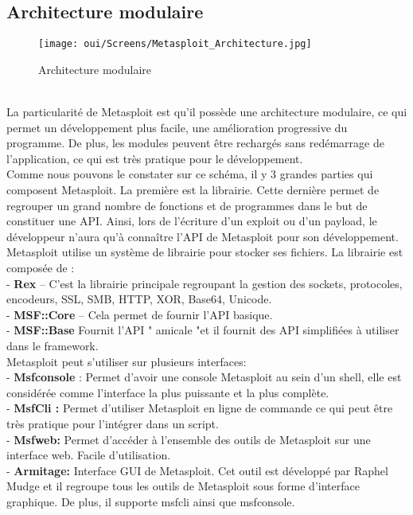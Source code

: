 \subsection{Architecture modulaire}
\begin{figure}[htp!]
  \centering
  \setlength\figureheight{7cm}
  \setlength\figurewidth{9cm}
  \texttt{[image: oui/Screens/Metasploit\_Architecture.jpg]}
  \caption{Architecture modulaire}
  \label{fig:courbe-tikz}
\end{figure}\\
La particularité de Metasploit est qu’il possède une architecture modulaire, ce qui permet un développement plus facile, une amélioration progressive du programme. De plus, les modules peuvent être rechargés sans redémarrage de l’application, ce qui est très pratique pour le développement.\\
Comme nous pouvons le constater sur ce schéma, il y 3 grandes parties qui composent Metasploit. La première est la librairie. Cette dernière permet de regrouper un grand nombre de fonctions et de programmes dans le but de constituer une API. Ainsi, lors de l’écriture d’un exploit ou d’un payload, le développeur n’aura qu'à connaître l’API de Metasploit pour son développement.\\
\noindent Metasploit utilise un système de librairie pour stocker ses fichiers.
\noindent La librairie est composée de :\\
- \textbf{Rex} – C’est la librairie principale regroupant la gestion des sockets, protocoles, encodeurs, SSL, SMB, HTTP, XOR, Base64, Unicode.\\
- \textbf{MSF::Core} – Cela permet de fournir l’API basique.\\
- \textbf{MSF::Base} Fournit l'API " amicale "et il fournit des API simplifiées à utiliser dans le framework.\\

\noindent Metasploit peut s’utiliser sur plusieurs interfaces:\\
- \textbf{Msfconsole} : Permet d’avoir une console Metasploit au sein d’un shell, elle est considérée comme l’interface la plus puissante et la plus complète.\\
- \textbf{MsfCli :} Permet d’utiliser Metasploit en ligne de commande ce qui peut être très pratique pour l’intégrer dans un script.\\
- \textbf{Msfweb:} Permet d’accéder à l’ensemble des outils de Metasploit sur une interface web. Facile d’utilisation.\\
- \textbf{Armitage:} Interface GUI de Metasploit. Cet outil est développé par Raphel Mudge et il regroupe tous les outils de Metasploit sous forme d’interface graphique. De plus, il supporte msfcli ainsi que msfconsole.\\

